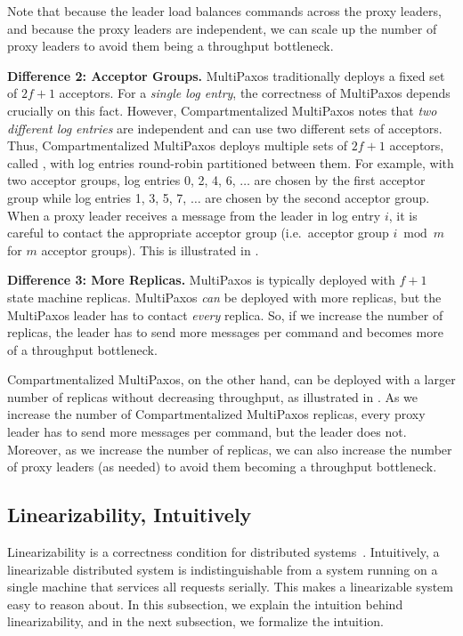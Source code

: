 Note that because the leader load balances commands across the proxy leaders,
and because the proxy leaders are independent, we can scale up the number of
proxy leaders to avoid them being a throughput bottleneck.

{}

\textbf{Difference 2: Acceptor Groups.}
MultiPaxos traditionally deploys a fixed set of $2f+1$ acceptors. For a
\emph{single log entry}, the correctness of MultiPaxos depends crucially on
this fact. However, Compartmentalized MultiPaxos notes that \emph{two
different log entries} are independent and can use two different sets of
acceptors.
%
Thus, Compartmentalized MultiPaxos deploys multiple sets of $2f+1$ acceptors,
called , with log entries round-robin partitioned
between them. For example, with two acceptor groups, log entries 0, 2, 4, 6,
$\ldots$ are chosen by the first acceptor group while log entries 1, 3, 5, 7,
$\ldots$ are chosen by the second acceptor group. When a proxy leader receives
a  message from the leader in log entry $i$, it is careful to
contact the appropriate acceptor group (i.e.\ acceptor group $i \bmod m$ for
$m$ acceptor groups).
%
This is illustrated in .

{}

\textbf{Difference 3: More Replicas.}
MultiPaxos is typically deployed with $f+1$ state machine replicas. MultiPaxos
\emph{can} be deployed with more replicas, but the MultiPaxos leader has to
contact \emph{every} replica. So, if we increase the number of replicas, the
leader has to send more messages per command and becomes more of a throughput
bottleneck.

Compartmentalized MultiPaxos, on the other hand, can be deployed with a larger
number of replicas without decreasing throughput, as illustrated in
. As we increase the number of
Compartmentalized MultiPaxos replicas, every proxy leader has to send more
messages per command, but the leader does not.  Moreover, as we increase the
number of replicas, we can also increase the number of proxy leaders (as
needed) to avoid them becoming a throughput bottleneck.

{}

\subsection{Linearizability, Intuitively}
Linearizability is a correctness condition for distributed
systems~\cite{herlihy1990linearizability}.  Intuitively, a linearizable
distributed system is indistinguishable from a system running on a single
machine that services all requests serially. This makes a linearizable system
easy to reason about. In this subsection, we explain the intuition behind
linearizability, and in the next subsection, we formalize the intuition.

